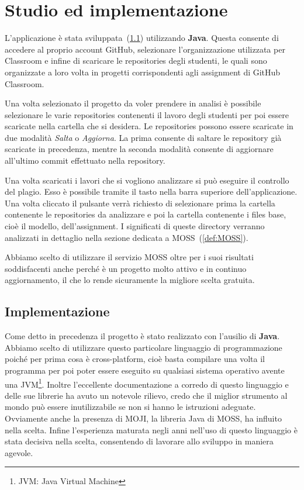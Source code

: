 \chapter{Studio ed implementazione}\label{def:StudioImplementazione}
	L'applicazione è stata sviluppata~(\ref{def:Implementazione}) utilizzando \textbf{Java}. Questa consente di accedere al proprio account GitHub, selezionare l'organizzazione utilizzata per Classroom e infine di scaricare le repositories degli studenti, le quali sono organizzate a loro volta in progetti corrispondenti agli assignment di GitHub Classroom.
	
	Una volta selezionato il progetto da voler prendere in analisi è possibile selezionare le varie repositories contenenti il lavoro degli studenti per poi essere scaricate nella cartella che si desidera.
	Le repositories possono essere scaricate in due modalità \textit{Salta} o \textit{Aggiorna}. La prima consente di saltare le repository già scaricate in precedenza, mentre la seconda modalità consente di aggiornare all'ultimo commit effettuato nella repository.
	
	Una volta scaricati i lavori che si vogliono analizzare si può eseguire il controllo del plagio. Esso è possibile tramite il tasto nella barra superiore dell'applicazione. Una volta cliccato il pulsante verrà richiesto di selezionare prima la cartella contenente le repositories da analizzare e poi la cartella contenente i files base, cioè il modello, dell'assignment.
	I significati di queste directory verranno analizzati in dettaglio nella sezione dedicata a MOSS~(\ref{def:MOSS}).
	
	Abbiamo scelto di utilizzare il servizio MOSS oltre per i suoi risultati soddisfacenti anche perché è un progetto molto attivo e in continuo aggiornamento, il che lo rende sicuramente la migliore scelta gratuita.
	
	\section{Implementazione}\label{def:Implementazione}
		Come detto in precedenza il progetto è stato realizzato con l'ausilio di \textbf{Java}.
		Abbiamo scelto di utilizzare questo particolare linguaggio di programmazione poiché per prima cosa è cross-platform, cioè basta compilare una volta il programma per poi poter essere eseguito su qualsiasi sistema operativo avente una JVM\footnote{JVM: Java Virtual Machine}.
		Inoltre l'eccellente documentazione a corredo di questo linguaggio e delle sue librerie ha avuto un notevole rilievo, credo che il miglior strumento al mondo può essere inutilizzabile se non si hanno le istruzioni adeguate.
		Ovviamente anche la presenza di MOJI, la libreria Java di MOSS, ha influito nella scelta.
		Infine l'esperienza maturata negli anni nell'uso di questo linguaggio è stata decisiva nella scelta, consentendo di lavorare allo sviluppo in maniera agevole.

